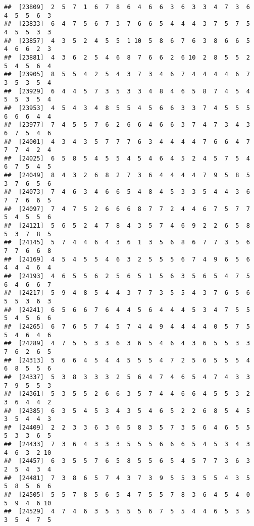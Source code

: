 \documentclass[
]{book}
\begin{document}
\begin{verbatim}
##  [23809]  2  5  7  1  6  7  8  6  4  6  6  3  6  3  3  4  7  3  6  4  5  5  6  3
##  [23833]  6  4  7  5  6  7  3  7  6  6  5  4  4  4  3  7  5  7  5  4  5  5  3  3
##  [23857]  4  3  5  2  4  5  5  1 10  5  8  6  7  6  3  8  6  6  5  4  6  6  2  3
##  [23881]  4  3  6  2  5  4  6  8  7  6  6  2  6 10  2  8  5  5  2  5  4  5  6  4
##  [23905]  8  5  5  4  2  5  4  3  7  3  4  6  7  4  4  4  4  6  7  3  5  3  5  4
##  [23929]  6  4  4  5  7  3  5  3  3  4  8  4  6  5  8  7  4  5  4  5  5  3  5  4
##  [23953]  4  5  4  3  4  8  5  5  4  5  6  6  3  3  7  4  5  5  5  6  6  6  4  4
##  [23977]  7  4  5  5  7  6  2  6  6  4  6  6  3  7  4  7  3  4  3  6  7  5  4  6
##  [24001]  4  3  4  3  5  7  7  7  6  3  4  4  4  4  7  6  6  4  7  7  7  4  2  4
##  [24025]  6  5  8  5  4  5  5  4  5  4  6  4  5  2  4  5  7  5  4  6  7  5  4  5
##  [24049]  8  4  3  2  6  8  2  7  3  6  4  4  4  4  7  9  5  8  5  3  7  6  5  6
##  [24073]  7  4  6  3  4  6  6  5  4  8  4  5  3  3  5  4  4  3  6  7  7  6  6  5
##  [24097]  7  4  7  5  2  6  6  6  8  7  7  2  4  4  6  7  5  7  7  5  4  5  5  6
##  [24121]  5  6  5  2  4  7  8  4  3  5  7  4  6  9  2  2  6  5  8  5  3  7  8  5
##  [24145]  5  7  4  4  6  4  3  6  1  3  5  6  8  6  7  7  3  5  6  7  7  6  6  8
##  [24169]  4  5  4  5  5  4  6  3  2  5  5  5  6  7  4  9  6  5  6  4  4  4  6  4
##  [24193]  4  6  5  5  6  2  5  6  5  1  5  6  3  5  6  5  4  7  5  6  4  6  6  7
##  [24217]  5  9  4  8  5  4  4  3  7  7  3  5  5  4  3  7  6  5  6  5  5  3  6  3
##  [24241]  6  5  6  6  7  6  4  4  5  6  4  4  4  5  3  4  7  5  5  5  4  5  6  6
##  [24265]  6  7  6  5  7  4  5  7  4  4  9  4  4  4  4  0  5  7  5  5  4  6  4  6
##  [24289]  4  7  5  5  3  3  6  3  6  5  4  6  4  3  6  5  5  3  3  7  6  2  6  5
##  [24313]  5  6  6  4  5  4  4  5  5  5  4  7  2  5  6  5  5  5  4  6  8  5  5  6
##  [24337]  5  3  8  3  3  3  2  5  6  4  7  4  6  5  4  7  4  3  3  7  9  5  5  3
##  [24361]  5  3  5  5  2  6  6  3  5  7  4  4  6  6  4  5  5  3  2  3  6  4  4  2
##  [24385]  6  3  5  4  5  3  4  3  5  4  6  5  2  2  6  8  5  4  5  3  5  4  4  3
##  [24409]  2  2  3  3  6  3  6  5  8  3  5  7  3  5  6  4  6  5  5  5  3  3  6  5
##  [24433]  7  3  6  4  3  3  3  5  5  5  6  6  6  5  4  5  3  4  3  4  6  3  2 10
##  [24457]  6  3  5  5  7  6  5  8  5  5  6  5  4  5  7  7  3  6  3  2  5  4  3  4
##  [24481]  7  3  8  6  5  7  4  3  7  3  9  5  5  3  5  5  4  3  5  5  8  5  6  6
##  [24505]  5  5  7  8  5  6  5  4  7  5  5  7  8  3  6  4  5  4  0  5  9  4  6 10
##  [24529]  4  7  4  6  3  5  5  5  5  6  7  5  5  4  4  6  5  3  5  3  5  4  7  5

\end{verbatim}
\end{document}
